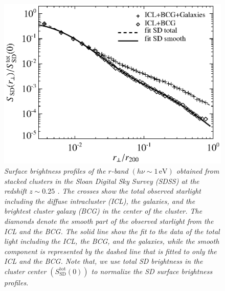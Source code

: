 \documentclass[10pt,aps,pra,reprint,amsmath,amsfonts,amssymb,showpacs,nofootinbib,floatfix]{revtex4-1}
\newcommand{\rmn}{\mathrm}
\newcommand{\sd}{\rmn{SD}}
\newcommand{\ev}{\rmn{eV}}
\begin{document}
\begin{figure}%
 \includegraphics[width=0.99\columnwidth]{figures/SB.photon.eps}
 \caption{\it Surface brightness profiles of the $r$-band $(h\nu\sim
   1\,\ev)$ obtained from stacked clusters in the Sloan Digital Sky
   Survey (SDSS) at the redshift $z \sim 0.25$ \protect
   \cite{2005MNRAS.358..949Z}. The crosses show the total observed
   starlight including the diffuse intracluster (ICL), the galaxies,
   and the brightest cluster galaxy (BCG) in the center of the
   cluster. The diamonds denote the smooth part of the observed
   starlight from the ICL and the BCG. The solid line show the fit to
   the data of the total light including the ICL, the BCG, and the
   galaxies, while the smooth component is represented by the dashed
   line that is fitted to only the ICL and the BCG. Note that, we use
   total SD brightness in the cluster center
   $(S_\sd^\rmn{tot}(0))$ to normalize the SD surface
   brightness profiles.}
 \label{fig:SD_spatial}
\end{figure}
\end{document}
